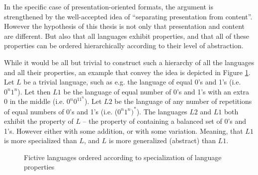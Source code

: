 \documentclass{scrreprt}
\begin{document}
In the specific case of presentation-oriented formats, the argument is strengthened by the well-accepted idea of ``separating presentation from content''. However the hypothesis of this thesis is not only that presentation and content are different. But also that all languages exhibit properties, and that all of these properties can be ordered hierarchically according to their level of abstraction.

While it would be all but trivial to construct such a hierarchy of all the languages and all their properties, an example that convey the idea is depicted in Figure \ref{fig:fictive-specialization-tree}. Let $L$ be a trivial language, such as e.g. the language of equal 0's and 1's (i.e. $0^n1^n$). Let then $L1$ be the language of equal number of 0's and 1's with an extra 0 in the middle (i.e. $0^n0^11^n$). Let $L2$ be the language of any number of repetitions of equal numbers of 0's and 1's (i.e. ($0^n1^n)^*$). The languages $L2$ and $L1$ both exhibit the property of $L$ -- the property of containing a balanced set of 0's and 1's. However either with some addition, or with some variation. Meaning, that $L1$ is more specialized than $L$, and $L$ is more generalized (abstract) than $L1$.





\begin{figure}[h]
  \centering

  \caption{Fictive languages ordered according to specialization of language properties}
  \label{fig:fictive-specialization-tree}
\end{figure}
\end{document}

